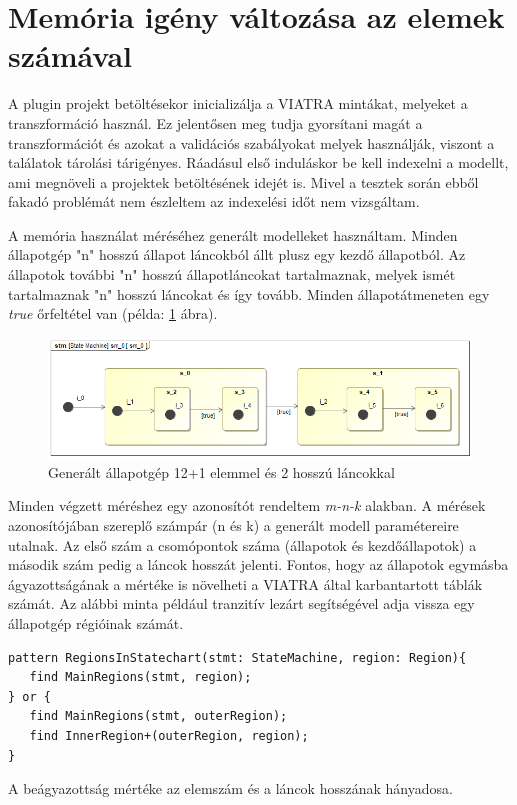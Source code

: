 \section{Memória igény változása az elemek számával}

A plugin projekt betöltésekor inicializálja a VIATRA mintákat, melyeket a transzformáció használ. Ez jelentősen meg tudja gyorsítani magát a transzformációt és azokat a validációs szabályokat melyek használják, viszont a találatok tárolási tárigényes. Ráadásul első induláskor be kell indexelni a modellt, ami megnöveli a projektek betöltésének idejét is. Mivel a tesztek során ebből fakadó problémát nem észleltem az indexelési időt nem vizsgáltam.

A memória használat méréséhez generált modelleket használtam. Minden állapotgép "n" hosszú állapot láncokból állt plusz egy kezdő állapotból. Az állapotok további "n" hosszú állapotláncokat tartalmaznak, melyek ismét tartalmaznak "n" hosszú láncokat és így tovább. Minden állapotátmeneten egy \emph{true} őrfeltétel van (példa: \ref{fig:generated} ábra).
\begin{figure}[!ht]
	\centering
	\includegraphics[width=12cm, keepaspectratio]{figures/evaluation/generated.png}
	\caption{Generált állapotgép 12+1 elemmel és 2 hosszú láncokkal}
	\label{fig:generated}
\end{figure}
\newpage
Minden végzett méréshez egy azonosítót rendeltem \emph{m-n-k} alakban. A mérések azonosítójában szereplő számpár (n és k) a generált modell paramétereire utalnak. Az első szám a csomópontok száma (állapotok és kezdőállapotok) a második szám pedig a láncok hosszát jelenti. Fontos, hogy az állapotok  egymásba ágyazottságának a mértéke is növelheti a VIATRA által karbantartott táblák számát. Az alábbi minta például tranzitív lezárt segítségével adja vissza egy állapotgép régióinak számát.
\begin{lstlisting}
pattern RegionsInStatechart(stmt: StateMachine, region: Region){
   find MainRegions(stmt, region);
} or {
   find MainRegions(stmt, outerRegion);
   find InnerRegion+(outerRegion, region);
}
\end{lstlisting}
 A beágyazottság mértéke az elemszám és a láncok hosszának hányadosa.\\

